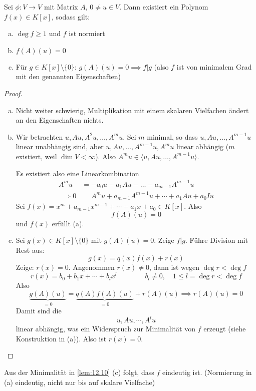 \documentclass[a4paper, 10pt]{scrbook}
\begin{document}
\begin{lem}
\label{lem:12.10}
Sei $\phi:V\to V$ mit Matrix $A$, $0\neq u\in V$.
Dann existiert ein Polynom $f(x)\in K[x]$, sodass gilt:
\begin{enumerate}[(a)]
	\item $\deg f\ge 1$ und $f$ ist normiert
	\item $f(A)(u)=0$
\item Für $g\in K[x]\setminus \{0\}$: $g(A)(u)=0\implies f|g$ (also $f$ ist von minimalem Grad mit den genannten Eigenschaften)
\end{enumerate}

\begin{proof}
	\begin{enumerate}[(a)]
\item
	Nicht weiter schwierig, Multiplikation mit einem skalaren Vielfachen ändert an den Eigenschaften nichts.
\item Wir betrachten $u, Au, A^2u,\dotsc,A^mu$.
Sei $m$ minimal, so dass $u,Au,\dotsc,A^{m-1}u$ linear unabhängig sind, aber $u,Au,\dotsc, A^{m-1}u,A^mu$ linear abhängig
($m$ existiert, weil $\dim V <\infty$).
Also $A^mu\in \langle u,Au,\dotsc,A^{m-1}u\rangle$.

Es existiert also eine Linearkombination
\begin{align*}
A^m u &= -a_0u-a_1Au-\dotsc -a_{m-1}A^{m-1}u\\
\implies 0&= A^mu +a_{m-1}A^{m-1}u + \dotsb + a_1Au + a_0I u
\end{align*}
Sei $f(x)=x^m+a_{m-1}x^{m-1}+\dotsb +a_1x+a_0 \in K[x]$.
Also
\[
f(A)(u)=0
\]
und $f(x)$ erfüllt (a).
\item
Sei $g(x)\in K[x]\setminus\{0\}$ mit $g(A)(u) = 0$.
Zeige $f|g$.
Führe Division mit Rest aus:
\[
g(x)=q(x)f(x)+r(x)
\]
Zeige: $r(x)=0$.
Angenommen $r(x) \neq 0$, dann ist wegen $\deg r<\deg f$
\[
r(x) = b_0 +b_1x+\dotsb +b_lx^l \qquad\qquad b_l\neq 0,\quad 1\le l=\deg r <\deg f
\]
Also
\[
\underbrace{g(A)(u)}_{=0} = \underbrace{q(A)f(A)(u)}_{=0} + r(A)(u) \implies r(A)(u) = 0
\]
Damit sind die
\[
u,Au, \dotsb, A^lu
\]
linear abhängig, was ein Widerspruch zur Minimalität von $f$ erzeugt (siehe Konstruktion in (a)).
Also ist $r(x)=0$.
\end{enumerate}
\end{proof}
\end{lem}


Aus der Minimalität in \ref{lem:12.10} (c) folgt, dass $f$ eindeutig ist.
(Normierung in (a) eindeutig, nicht nur bis auf skalare Vielfache)
\end{document}
